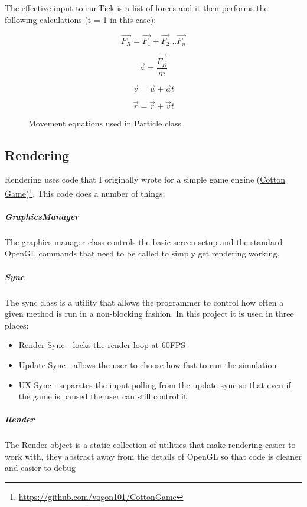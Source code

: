 			The effective input to runTick is a list of forces and it then performs the following calculations (t = 1 in this case):
			
			\begin{figure}
				\begin{equation}
					\vec{F_{R}} = \vec{F_{1}} + \vec{F_{2}} ... \vec{F_{n}}
				\end{equation}
				
				\begin{equation}
					\vec{a} = \frac{\vec{F_{R}}}{m}
				\end{equation}
				
				\begin{equation}
					\vec{v} = \vec{u} + \vec{a}t
				\end{equation}
				
				\begin{equation}
					\vec{r} = \vec{r} + \vec{v}t
				\end{equation}
				\caption{Movement equations used in Particle class}
				\label{fig:movEqn}
			\end{figure}
	\newpage
	\subsection{Rendering}
		
		Rendering uses code that I originally wrote for a simple game engine (\href{https://github.com/vogon101/CottonGame}{Cotton Game})\footnote{\url{https://github.com/vogon101/CottonGame}}. This code does a number of things:
		
		\subparagraph{GraphicsManager} 
			
			The graphics manager class controls the basic screen setup and the standard OpenGL commands that need to be called to simply get rendering working.
		
		\subparagraph{Sync} 
		
			The sync class is a utility that allows the programmer to control how often a given method is run in a non-blocking fashion. In this project it is used in three places:
			
			\begin{itemize}
			\item Render Sync - locks the render loop at 60FPS
			
			\item Update Sync - allows the user to choose how fast to run the simulation
			
			\item UX Sync - separates the input polling from the update sync so that even if the game is paused the user can still control it
		\end{itemize}
		
		\subparagraph{Render} 
		
			The Render object is a static collection of utilities that make rendering easier to work with, they abstract away from the details of OpenGL so that code is cleaner and easier to debug
	